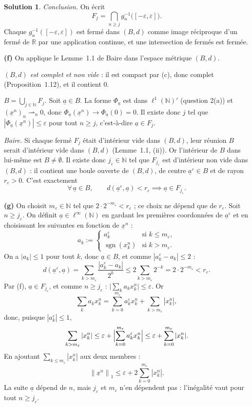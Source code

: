 \documentclass[11pt,a4paper]{article}
\newcommand{\R}{\mathbb{R}}
\newcommand{\N}{\mathbb{N}}
\newcommand{\norm}[1]{\left\|#1\right\|}
\newcommand{\wk}{\rightharpoonup}
\DeclareMathOperator{\sgn}{sgn}
\theoremstyle{definition}
\newtheorem*{solution}{Solution}
\newcommand{\su}[1]{\underline{#1}}
\newcommand{\linf}{\ell^\infty(\N)}
\newcommand{\lun}{\ell^1(\N)}
\begin{document}
\begin{solution}
\emph{Conclusion.} On écrit
\[
  F_j=\bigcap_{n\ge j}g_n^{-1}\bigl([-\varepsilon,\varepsilon]\bigr).
\]
Chaque $g_n^{-1}([-\varepsilon,\varepsilon])$ est fermé dans $(B,d)$ comme image réciproque d'un fermé de $\R$ par une application continue, et une intersection de fermés est fermée.

\medskip
\noindent\textbf{(f)} On applique le Lemme~1.1 de Baire dans l'espace métrique $(B,d)$.

\emph{$(B,d)$ est complet et non vide} : il est compact par (c), donc complet (Proposition~1.12), et il contient $0$.

\emph{$B=\bigcup_{j\in\N}F_j$.} Soit $\su a\in B$. La forme $\Phi_{\su a}$ est dans $\lun'$ (question 2(a)) et $(\su x^n)_n\wk_n0$, donc $\Phi_{\su a}(\su x^n)\to\Phi_{\su a}(0)=0$. Il existe donc $j$ tel que $|\Phi_{\su a}(\su x^n)|\le\varepsilon$ pour tout $n\ge j$, c'est-à-dire $\su a\in F_j$.

\emph{Baire.} Si chaque fermé $F_j$ était d'intérieur vide dans $(B,d)$, leur réunion $B$ serait d'intérieur vide dans $(B,d)$ (Lemme~1.1, (ii)). Or l'intérieur de $B$ dans lui-même est $B\ne\emptyset$. Il existe donc $j_\varepsilon\in\N$ tel que $F_{j_\varepsilon}$ est d'intérieur non vide dans $(B,d)$ : il contient une boule ouverte de $(B,d)$, de centre $\su a^\varepsilon\in B$ et de rayon $r_\varepsilon>0$. C'est exactement
\[
  \forall\,\su a\in B,\qquad d(\su a^\varepsilon,\su a)<r_\varepsilon\implies\su a\in F_{j_\varepsilon}.
\]

\medskip
\noindent\textbf{(g)} On choisit $m_\varepsilon\in\N$ tel que $2\cdot2^{-m_\varepsilon}<r_\varepsilon$ ; ce choix ne dépend que de $r_\varepsilon$. Soit $n\ge j_\varepsilon$. On définit $\su a\in\linf$ en gardant les premières coordonnées de $\su a^\varepsilon$ et en choisissant les suivantes en fonction de $\su x^n$ :
\[
  a_k:=\begin{cases}a^\varepsilon_k&\text{si }k\le m_\varepsilon,\\ \sgn(x^n_k)&\text{si }k>m_\varepsilon.\end{cases}
\]
On a $|a_k|\le1$ pour tout $k$, donc $\su a\in B$, et comme $|a^\varepsilon_k-a_k|\le2$ :
\[
  d(\su a^\varepsilon,\su a)=\sum_{k>m_\varepsilon}\frac{|a^\varepsilon_k-a_k|}{2^k}\le2\sum_{k>m_\varepsilon}2^{-k}=2\cdot2^{-m_\varepsilon}<r_\varepsilon .
\]
Par (f), $\su a\in F_{j_\varepsilon}$, et comme $n\ge j_\varepsilon$ : $\bigl|\sum_ka_kx^n_k\bigr|\le\varepsilon$. Or
\[
  \sum_ka_kx^n_k=\sum_{k=0}^{m_\varepsilon}a^\varepsilon_kx^n_k+\sum_{k>m_\varepsilon}|x^n_k| ,
\]
donc, puisque $|a^\varepsilon_k|\le1$,
\[
  \sum_{k>m_\varepsilon}|x^n_k|\le\varepsilon+\Bigl|\sum_{k=0}^{m_\varepsilon}a^\varepsilon_kx^n_k\Bigr|\le\varepsilon+\sum_{k=0}^{m_\varepsilon}|x^n_k| .
\]
En ajoutant $\sum_{k\le m_\varepsilon}|x^n_k|$ aux deux membres :
\[
  \norm{\su x^n}_1\le\varepsilon+2\sum_{k=0}^{m_\varepsilon}|x^n_k| .
\]
La suite $\su a$ dépend de $n$, mais $j_\varepsilon$ et $m_\varepsilon$ n'en dépendent pas : l'inégalité vaut pour tout $n\ge j_\varepsilon$.


\end{solution}
\end{document}
